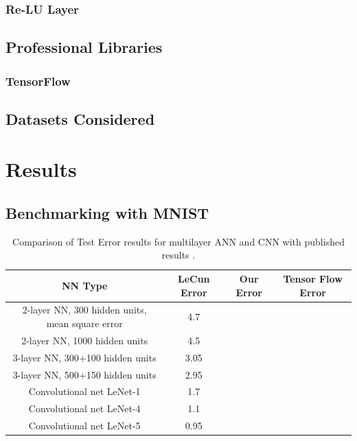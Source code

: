 \documentclass[12pt, twocolumn]{article}
\begin{document}
\subsubsection{Re-LU Layer}
\subsection{Professional Libraries}
\subsubsection{TensorFlow}

\subsection{Datasets Considered}


\section{Results}



\subsection{Benchmarking with MNIST}
\begin{center}
\begin{table}[t]
\begin{tabular} { |c | c | c | c | }
    \hline
    NN Type & LeCun Error  &  Our Error  & Tensor Flow Error \\ \hline
    2-layer NN, 300 hidden units, mean square error & 4.7 &  & \\ \hline
    2-layer NN, 1000 hidden units & 4.5 & & \\ \hline
    3-layer NN, 300+100 hidden units & 3.05 & &  \\ \hline
    3-layer NN, 500+150 hidden units & 2.95 & & \\ \hline
    Convolutional net LeNet-1 & 1.7 &  & \\ \hline 
    Convolutional net LeNet-4 & 1.1& & \\ \hline 
    Convolutional net LeNet-5 &  0.95 & &\\ \hline
\end{tabular}
\label{table: MNISTLeCun}
\caption{Comparison of Test Error results for multilayer ANN and CNN with published results \cite{LeCun1998}.}
\end{table}
\end{center}
\end{document}
